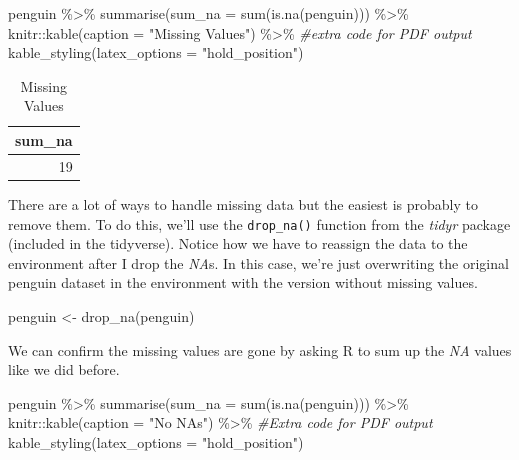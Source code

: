 \documentclass[
]{article}
\newenvironment{Shaded}{\begin{snugshade}}{\end{snugshade}}
\newcommand{\AttributeTok}[1]{\textcolor[rgb]{0.77,0.63,0.00}{#1}}
\newcommand{\CommentTok}[1]{\textcolor[rgb]{0.56,0.35,0.01}{\textit{#1}}}
\newcommand{\FunctionTok}[1]{\textcolor[rgb]{0.00,0.00,0.00}{#1}}
\newcommand{\NormalTok}[1]{#1}
\newcommand{\OtherTok}[1]{\textcolor[rgb]{0.56,0.35,0.01}{#1}}
\newcommand{\SpecialCharTok}[1]{\textcolor[rgb]{0.00,0.00,0.00}{#1}}
\newcommand{\StringTok}[1]{\textcolor[rgb]{0.31,0.60,0.02}{#1}}
\begin{document}
\begin{Shaded}
\begin{Highlighting}[]
\NormalTok{penguin }\SpecialCharTok{\%\textgreater{}\%} 
  \FunctionTok{summarise}\NormalTok{(}\AttributeTok{sum\_na =} \FunctionTok{sum}\NormalTok{(}\FunctionTok{is.na}\NormalTok{(penguin))) }\SpecialCharTok{\%\textgreater{}\%} 
\NormalTok{  knitr}\SpecialCharTok{::}\FunctionTok{kable}\NormalTok{(}\AttributeTok{caption =} \StringTok{"Missing Values"}\NormalTok{) }\SpecialCharTok{\%\textgreater{}\%} \CommentTok{\#extra code for PDF output}
  \FunctionTok{kable\_styling}\NormalTok{(}\AttributeTok{latex\_options =} \StringTok{"hold\_position"}\NormalTok{)}
\end{Highlighting}
\end{Shaded}

\begin{table}[!h]

\caption{\label{tab:missing data}Missing Values}
\centering
\begin{tabular}[t]{r}
\hline
sum\_na\\
\hline
19\\
\hline
\end{tabular}
\end{table}

There are a lot of ways to handle missing data but the easiest is
probably to remove them. To do this, we'll use the \texttt{drop\_na()}
function from the \emph{tidyr} package (included in the tidyverse).
Notice how we have to reassign the data to the environment after I drop
the \emph{NA}s. In this case, we're just overwriting the original
penguin dataset in the environment with the version without missing
values.

\begin{Shaded}
\begin{Highlighting}[]
\NormalTok{penguin }\OtherTok{\textless{}{-}} \FunctionTok{drop\_na}\NormalTok{(penguin)}
\end{Highlighting}
\end{Shaded}

We can confirm the missing values are gone by asking R to sum up the
\emph{NA} values like we did before.

\begin{Shaded}
\begin{Highlighting}[]
\NormalTok{penguin }\SpecialCharTok{\%\textgreater{}\%} 
  \FunctionTok{summarise}\NormalTok{(}\AttributeTok{sum\_na =} \FunctionTok{sum}\NormalTok{(}\FunctionTok{is.na}\NormalTok{(penguin))) }\SpecialCharTok{\%\textgreater{}\%} 
\NormalTok{  knitr}\SpecialCharTok{::}\FunctionTok{kable}\NormalTok{(}\AttributeTok{caption =} \StringTok{"No NAs"}\NormalTok{) }\SpecialCharTok{\%\textgreater{}\%} \CommentTok{\#Extra code for PDF output}
  \FunctionTok{kable\_styling}\NormalTok{(}\AttributeTok{latex\_options =} \StringTok{"hold\_position"}\NormalTok{)}
\end{Highlighting}
\end{Shaded}
\end{document}
